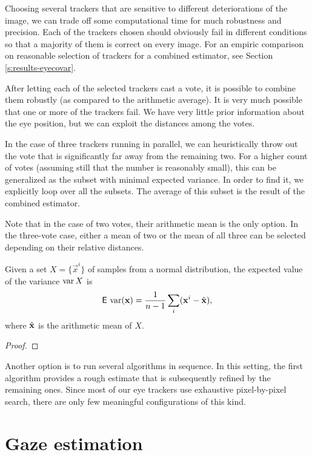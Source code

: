Choosing several trackers that are sensitive to different deteriorations of the image, we can trade off some computational time for much robustness and precision.
Each of the trackers chosen should obviously fail in different conditions so that a majority of them is correct on every image.
For an empiric comparison on reasonable selection of trackers for a combined estimator, see Section \ref{s:results-eyecovar}.

After letting each of the selected trackers cast a vote, it is possible to combine them robustly (as compared to the arithmetic average).
It is very much possible that one or more of the trackers fail.
We have very little prior information about the eye position, but we can exploit the distances among the votes.

In the case of three trackers running in parallel, we can heuristically throw out the vote that is significantly far away from the remaining two.
For a higher count of votes (assuming still that the number is reasonably small), this can be generalized as the subset with minimal expected variance.
In order to find it, we explicitly loop over all the subsets.
The average of this subset is the result of the combined estimator.

Note that in the case of two votes, their arithmetic mean is the only option.
In the three-vote case, either a mean of two or the mean of all three can be selected depending on their relative distances.

\begin{lemma}
Given a set $X = \{\vec x^i\}$ of samples from a normal distribution, the expected value of the variance $\operatorname{\mathrm{var}} X$ is
$$\operatorname{\textsf{E}\,}\operatorname{\mathrm{var}} (\mathbf{x}) = \frac 1 {n - 1} \sum_i (\mathbf{x}^i - \hat{\mathbf{x}}),$$
where $\hat{\mathbf{x}}$ is the arithmetic mean of $X$.
\end{lemma}
\begin{proof}
\end{proof}

Another option is to run several algorithms in sequence.
In this setting, the first algorithm provides a rough estimate that is subsequently refined by the remaining ones.
Since most of our eye trackers use exhaustive pixel-by-pixel search, there are only few meaningful configurations of this kind.

\section{Gaze estimation}
\label{s:impl-gaze}


